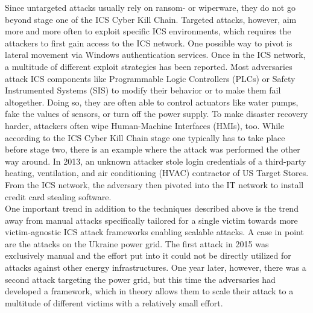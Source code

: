 \documentclass[runningheads]{llncs}
\begin{document}
Since untargeted attacks usually rely on ransom- or wiperware, they do not go beyond stage one of the ICS Cyber Kill Chain.
Targeted attacks, however, aim more and more often to exploit specific ICS environments, which requires the attackers to first gain access to the ICS network.
One possible way to pivot is lateral movement via Windows authentication services.
Once in the ICS network, a multitude of different exploit strategies has been reported.
Most adversaries attack ICS components like Programmable Logic Controllers (PLCs) or Safety Instrumented Systems (SIS) to modify their behavior or to make them fail altogether.
Doing so, they are often able to control actuators like water pumps, fake the values of sensors, or turn off the power supply.
To make disaster recovery harder, attackers often wipe Human-Machine Interfaces (HMIs), too.
While according to the ICS Cyber Kill Chain stage one typically has to take place before stage two, there is an example where the attack was performed the other way around.
In 2013, an unknown attacker stole login credentials of a third-party heating, ventilation, and air conditioning (HVAC) contractor of US Target Stores.
From the ICS network, the adversary then pivoted into the IT network to install credit card stealing software. \cite{hemsley.18}\\
One important trend in addition to the techniques described above is the trend away from manual attacks specifically tailored for a single victim towards more victim-agnostic ICS attack frameworks enabling scalable attacks.
A case in point are the attacks on the Ukraine power grid.
The first attack in 2015 was exclusively manual and the effort put into it could not be directly utilized for attacks against other energy infrastructures.
One year later, however, there was a second attack targeting the power grid, but this time the adversaries had developed a framework, which in theory allows them to scale their attack to a multitude of different victims with a relatively small effort. \cite{greenberg.17}
\end{document}

